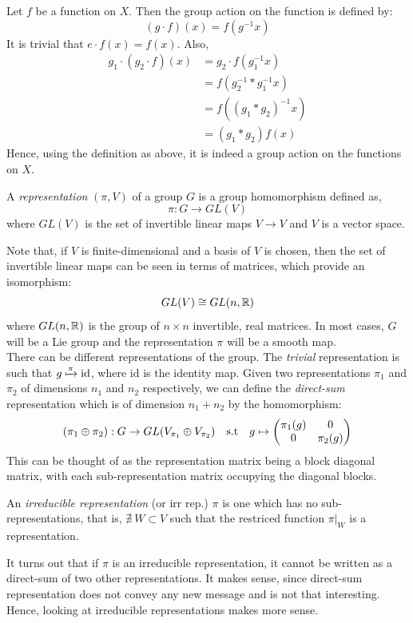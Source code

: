 Let $f$ be a function on $X$. Then the group action on the function is defined by:
$$(g\cdot f)(x) = f(g^{-1}x)$$
It is trivial that $e\cdot f (x) = f(x)$. Also, 
\begin{align*}
    g_1 \cdot (g_2 \cdot f)(x) &= g_2\cdot f(g_1^{-1}x)\\
    &=f(g_2^{-1}* g_1^{-1} x)\\
    &=f((g_1*g_2)^{-1}x)\\
    &=(g_1*g_2)f(x)
\end{align*}
Hence, using the definition as above, it is indeed a group action on the functions on $X$.
\begin{definition}[Representation]
    A \textit{representation} $(\pi,V)$ of a group $G$ is a group homomorphism defined as,
    $$\pi: G\rightarrow GL(V)$$
    where $GL(V)$ is the set of invertible linear maps $V\rightarrow V$ and $V$ is a vector space.
\end{definition}
Note that, if $V$ is finite-dimensional and a basis of $V$ is chosen, then the set of invertible linear maps can be seen in terms of matrices, which provide an isomorphism:
$$GL(V) \cong GL(n,\mathbb{R})$$
where $GL(n,\mathbb{R})$ is the group of $n\times n$ invertible, real matrices. In most cases, $G$ will be a Lie group and the representation $\pi$ will be a smooth map. \\[0.2cm]
There can be different representations of the group. The \textit{trivial} representation is such that $g\xmapsto{\pi}\mathrm{id}$, where $\mathrm{id}$ is the identity map. Given two representations $\pi_1$ and $\pi_2$ of dimensions $n_1$ and $n_2$ respectively, we can define the \textit{direct-sum} representation which is of dimension $n_1+n_2$ by the homomorphism:
$$(\pi_1\oplus \pi_2): G\rightarrow GL(V_{\pi_1}\oplus V_{\pi_2}) \quad \mathrm{s.t}\quad g\mapsto \mqty(\pi_1(g)& 0\\ 0&\pi_2(g))$$
This can be thought of as the representation matrix being a block diagonal matrix, with each sub-representation matrix occupying the diagonal blocks.
\begin{definition}
    An \textit{irreducible representation} (or irr rep.) $\pi$ is one which has no sub-representations, that is, $\nexists\ W\subset V$ such that the restriced function $\pi|_{W}$ is a representation.
\end{definition}
It turns out that if $\pi$ is an irreducible representation, it cannot be written as a direct-sum of two other representations. It makes sense, since direct-sum representation does not convey any new message and is not that interesting. Hence, looking at irreducible representations makes more sense.


